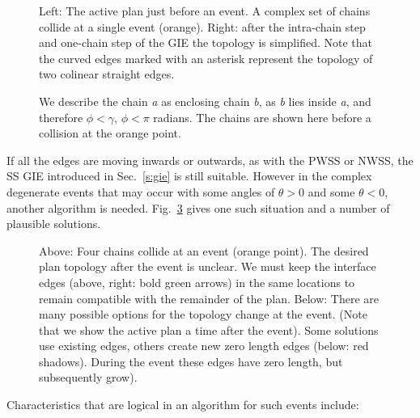 \begin{figure}
  \centering
  \def\svgwidth{1.0\columnwidth}
  
  \caption[A point degeneracy]{\label{fig:wss_example_topology} Left: The active plan just before an event. A complex set of chains collide at a single event (orange). Right: after the intra-chain step and one-chain step of the GIE the topology is simplified. Note that the curved edges marked with an asterisk represent the topology of two colinear straight edges.}
\end{figure}

\begin{figure}
  \centering
  \def\svgwidth{0.4\columnwidth}
  
  \caption[Enclosing chains]{\label{fig:wss_enclosing_chain} We describe the chain \emph{a} as enclosing chain \emph{b}, as \emph{b} lies inside \emph{a}, and therefore $\phi < \gamma$, $\phi < \pi$ radians. The chains are shown here before a collision at the orange point.}
\end{figure}

If all the edges are moving inwards or outwards, as with the PWSS or NWSS, the SS GIE introduced in Sec.~\ref{s:gie} is still suitable. However in the complex degenerate events that may occur with some angles of $\theta > 0$ and some $\theta < 0$, another algorithm is needed. Fig.~\ref{fig:wss_options} gives one such situation and a number of plausible solutions.

\begin{figure}
  \centering
  \def\svgwidth{1.0\columnwidth}
  
  \caption[Several solutions to the MWSS]{\label{fig:wss_options}Above: Four chains collide at an event (orange point). The desired plan topology after the event is unclear. We must keep the interface edges (above, right: bold green arrows) in the same locations to remain compatible with the remainder of the plan. Below: There are many possible options for the topology change at the event. (Note that we show the active plan a time after the event). Some solutions use existing edges, others create new zero length edges (below: red shadows). During the event these edges have zero length, but subsequently grow).}
\end{figure}

\FloatBarrier

Characteristics that are logical in an algorithm for such events include:

